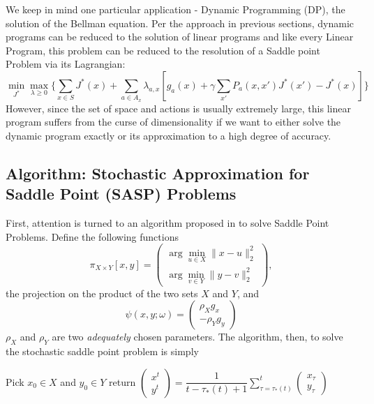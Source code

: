 \documentclass[12pt,reqno]{amsart}
\numberwithin{equation}{section}
\begin{document}
We keep in mind one particular application - Dynamic Programming (DP), the solution of the Bellman equation. Per the approach in previous sections, dynamic programs can be reduced to the solution of linear programs and like every Linear Program, this problem can be reduced to the resolution of a Saddle point Problem via its Lagrangian:
$$
\min_{J^{*}}\max_{\lambda \geq 0}\{ \sum_{x \in S} J^{*}(x) + \sum_{a \in A_x} \lambda_{a,x}[g_a(x) + \gamma \sum_{x'} P_a(x,x')J^{*}(x') - J^{*}(x)] \}
$$
However, since the set of space and actions is usually extremely large, this linear program suffers from the curse of dimensionality if we want to either solve the dynamic program exactly or its approximation to a high degree of accuracy.

\subsection{Algorithm: Stochastic Approximation for Saddle Point (SASP) Problems}

First, attention is turned to an algorithm proposed in \cite{NemirovskiRubinstein} to solve Saddle Point Problems. Define the following functions
$$\pi_{X \times Y}[x,y] = \begin{pmatrix} \arg\min_{u \in X}\lVert x - u \rVert_{2}^{2} \\ \arg\min_{v \in Y}\lVert y - v \rVert_{2}^{2} \end{pmatrix},$$
the projection on the product of the two sets $X$ and $Y$, and
$$\psi(x,y;\omega) = \begin{pmatrix} \rho_{X} g_{x} \\ -\rho_{Y} g_{y}  \end{pmatrix}$$
$\rho_{X}$ and $\rho_{Y}$ are two \emph{adequately} chosen parameters. The algorithm, then, to solve the stochastic saddle point problem is simply

\smallskip
\begin{algorithm}[H]
\SetAlgoLined
{}
Pick $x_{0} \in X$ and $y_{0} \in Y$\;
return $\begin{pmatrix} x^{t} \\ y^{t} \end{pmatrix} = \dfrac{1}{t - \tau_{*}(t) + 1}\sum_{\tau = \tau_{*}(t)}^{t}\begin{pmatrix} x_{\tau} \\ y_{\tau} \end{pmatrix}$\;
\end{algorithm}
\smallskip
\end{document}

